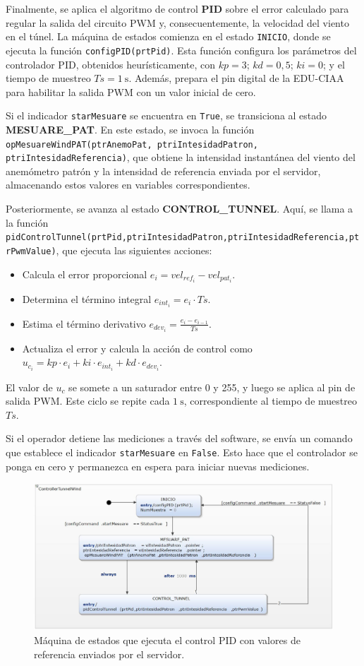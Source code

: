Finalmente, se aplica el algoritmo de control \textbf{PID} sobre el error calculado para regular la salida del circuito PWM y, consecuentemente, la velocidad del viento en el túnel. La máquina de estados comienza en el estado \texttt{INICIO}, donde se ejecuta la función \texttt{configPID(prtPid)}. Esta función configura los parámetros del controlador PID, obtenidos heurísticamente, con $kp = 3$; $kd = 0,5$; $ki = 0$; y el tiempo de muestreo $Ts = \SI{1}{\second}$. Además, prepara el pin digital de la EDU-CIAA para habilitar la salida PWM con un valor inicial de cero.

Si el indicador \texttt{starMesuare} se encuentra en \texttt{True}, se transiciona al estado \textbf{MESUARE\_PAT}. En este estado, se invoca la función \texttt{opMesuareWindPAT(ptrAnemoPat, ptriIntesidadPatron, ptriIntesidadReferencia)}, que obtiene la intensidad instantánea del viento del anemómetro patrón y la intensidad de referencia enviada por el servidor, almacenando estos valores en variables correspondientes.

Posteriormente, se avanza al estado \textbf{CONTROL\_TUNNEL}. Aquí, se llama a la función \texttt{pidControlTunnel(prtPid,ptriIntesidadPatron,ptriIntesidadReferencia,ptrPwmValue)}, que ejecuta las siguientes acciones:
\begin{itemize}
    \item Calcula el error proporcional $e_{i} = vel_{ref_{i}} - vel_{pat_{i}}$.
    \item Determina el término integral $e_{int_{i}} = e_{i} \cdot Ts$.
    \item Estima el término derivativo $e_{dev_{i}} = \frac{e_{i} - e_{i-1}}{Ts}$.
    \item Actualiza el error y calcula la acción de control como $u_{c_{i}} = kp \cdot e_{i} + ki \cdot e_{int_{i}} + kd \cdot e_{dev_{i}}$.
\end{itemize}
El valor de $u_{c}$ se somete a un saturador entre 0 y 255, y luego se aplica al pin de salida PWM. Este ciclo se repite cada $\SI{1}{\second}$, correspondiente al tiempo de muestreo $Ts$.

Si el operador detiene las mediciones a través del software, se envía un comando que establece el indicador \texttt{starMesuare} en \texttt{False}. Esto hace que el controlador se ponga en cero y permanezca en espera para iniciar nuevas mediciones.

\begin{figure}[H]
    \centering
    \includegraphics[width=0.95\linewidth]{Figuras/datalogger/Firmware/pidControlTunel.jpg}
    \caption{Máquina de estados que ejecuta el control PID con valores de referencia enviados por el servidor.}
    \label{fig:pidControlTunel}
\end{figure}
